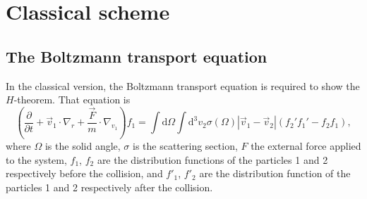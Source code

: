 

\section{Classical scheme}

\subsection{The Boltzmann transport equation}

In the classical version, the Boltzmann transport equation is required to show
the $H$-theorem. That equation is
%
\begin{equation}\label{eq:transport}
  \left(
    \frac{\partial}{\partial t}+\vec{v}_1 \cdot\nabla_r
    +\frac{\vec{F}}{m}\cdot\nabla_{v_1}
  \right)f_1=\int\mathrm{d}\Omega\int
    \mathrm{d}^{3}v_2\sigma(\Omega)|\vec{v}_1-\vec{v}_2|(f_2'f_1'-f_2f_1),
\end{equation}
%
where $\Omega$ is the solid angle, $\sigma$ is the scattering section, $F$ the
external force applied to the system, $f_1$, $f_2$ are the distribution
functions of the particles 1 and 2 respectively before the collision,
and $f'_1$, $f'_2$ are the distribution function of the particles 1 and 2
respectively after the collision.

